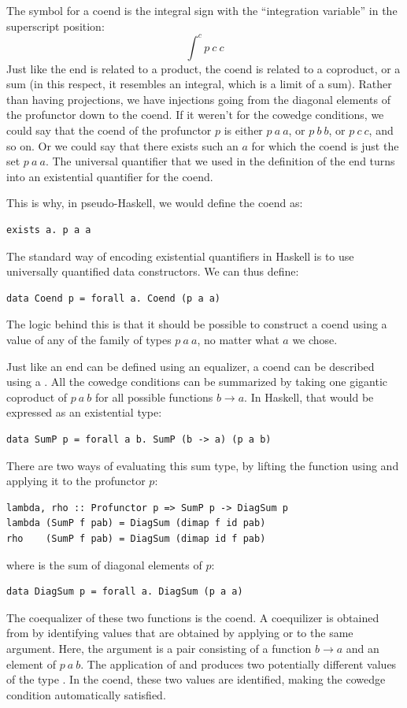 The symbol for a coend is the integral sign with the ``integration
variable'' in the superscript position:
\[\int^c p\ c\ c\]
Just like the end is related to a product, the coend is related to a
coproduct, or a sum (in this respect, it resembles an integral, which is
a limit of a sum). Rather than having projections, we have injections
going from the diagonal elements of the profunctor down to the coend. If
it weren't for the cowedge conditions, we could say that the coend of
the profunctor $p$ is either $p\ a\ a$, or
$p\ b\ b$, or $p\ c\ c$, and so on. Or we could say that
there exists such an $a$ for which the coend is just the set
$p\ a\ a$. The universal quantifier that we used in the
definition of the end turns into an existential quantifier for the
coend.

This is why, in pseudo-Haskell, we would define the coend as:

\begin{Verbatim}
exists a. p a a
\end{Verbatim}
The standard way of encoding existential quantifiers in Haskell is to
use universally quantified data constructors. We can thus define:

\begin{Verbatim}
data Coend p = forall a. Coend (p a a)
\end{Verbatim}
The logic behind this is that it should be possible to construct a coend
using a value of any of the family of types $p\ a\ a$, no matter
what $a$ we chose.

Just like an end can be defined using an equalizer, a coend can be
described using a . All the cowedge conditions can be
summarized by taking one gigantic coproduct of $p\ a\ b$ for all
possible functions $b \to a$. In Haskell, that would be
expressed as an existential type:

\begin{Verbatim}
data SumP p = forall a b. SumP (b -> a) (p a b)
\end{Verbatim}
There are two ways of evaluating this sum type, by lifting the function
using  and applying it to the profunctor $p$:

\begin{Verbatim}
lambda, rho :: Profunctor p => SumP p -> DiagSum p
lambda (SumP f pab) = DiagSum (dimap f id pab)
rho    (SumP f pab) = DiagSum (dimap id f pab)
\end{Verbatim}
where  is the sum of diagonal elements of $p$:

\begin{Verbatim}
data DiagSum p = forall a. DiagSum (p a a)
\end{Verbatim}
The coequalizer of these two functions is the coend. A coequilizer is
obtained from  by identifying values that are
obtained by applying  or  to the same
argument. Here, the argument is a pair consisting of a function
$b \to a$ and an element of $p\ a\ b$. The
application of  and  produces two potentially
different values of the type . In the coend, these
two values are identified, making the cowedge condition automatically
satisfied.

